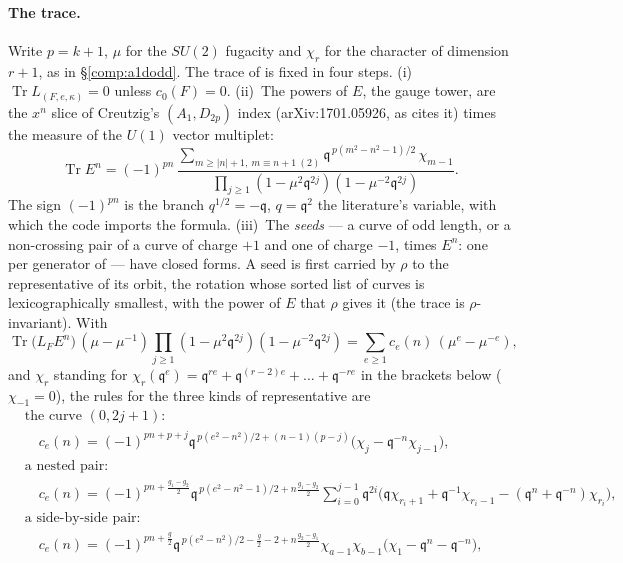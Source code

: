 \documentclass[11pt]{amsart}
\DeclareMathOperator{\Tr}{Tr}
\newcommand\fq{\mathfrak{q}}
\theoremstyle{remark}
\begin{document}
\paragraph{The trace.}  Write $p=k+1$, $\mu$ for the $SU(2)$ fugacity and
$\chi_r$ for the character of dimension $r+1$, as in \S\ref{comp:a1dodd}.
The trace of  is fixed in four steps.
(i)~$\Tr L_{(F,e,\kappa)}=0$ unless $c_0(F)=0$.
(ii)~The powers of $E$, the gauge tower, are the $x^n$ slice of Creutzig's
$(A_1,D_{2p})$ index (arXiv:1701.05926, as  cites
it) times the measure of the $U(1)$ vector multiplet:
\begin{equation}\label{eq:comp-deven-tower}
  \Tr E^n=(-1)^{pn}\,\frac{\sum_{m\ge|n|+1,\ m\equiv n+1\ (2)}\fq^{\,p(m^2-n^2-1)/2}\,\chi_{m-1}}
  {\prod_{j\ge1}(1-\mu^2\fq^{2j})(1-\mu^{-2}\fq^{2j})}.
\end{equation}
The sign $(-1)^{pn}$ is the branch $q^{1/2}=-\fq$, $q=\fq^2$ the
literature's variable, with which the code imports the formula.
(iii)~The \emph{seeds} --- a curve of odd length, or a non-crossing pair of a
curve of charge $+1$ and one of charge $-1$, times $E^n$: one per generator
of  --- have closed forms.  A seed is first carried by
$\rho$ to the representative of its orbit, the rotation whose sorted list of
curves is lexicographically smallest, with the power of $E$ that $\rho$ gives
it (the trace is $\rho$-invariant).  With
\[
  \Tr\bigl(L_FE^n\bigr)\,(\mu-\mu^{-1})\prod_{j\ge1}(1-\mu^2\fq^{2j})(1-\mu^{-2}\fq^{2j})
  =\sum_{e\ge1}c_e(n)\,(\mu^e-\mu^{-e}),
\]
and $\chi_r$ standing for $\chi_r(\fq^e)=\fq^{re}+\fq^{(r-2)e}+\dots+\fq^{-re}$
in the brackets below ($\chi_{-1}=0$), the rules for the three kinds of
representative are
\begin{equation}\label{eq:comp-deven-seeds}
\begin{aligned}
  &\text{the curve }(0,2j+1)\text{:}\\
  &\quad c_e(n)=(-1)^{pn+p+j}\fq^{\,p(e^2-n^2)/2+(n-1)(p-j)}\bigl(\chi_j-\fq^{-n}\chi_{j-1}\bigr),\\
  &\text{a nested pair:}\\
  &\quad c_e(n)=(-1)^{pn+\frac{g_1-g_2}2}\fq^{\,p(e^2-n^2-1)/2+n\frac{g_1-g_2}2}
     \sum_{i=0}^{j-1}\fq^{2i}\bigl(\fq\chi_{r_i+1}+\fq^{-1}\chi_{r_i-1}-(\fq^n+\fq^{-n})\chi_{r_i}\bigr),\\
  &\text{a side-by-side pair:}\\
  &\quad c_e(n)=(-1)^{pn+\frac g2}\fq^{\,p(e^2-n^2)/2-\frac g2-2+n\frac{g_2-g_1}2}
     \chi_{a-1}\chi_{b-1}\bigl(\chi_1-\fq^n-\fq^{-n}\bigr),
\end{aligned}
\end{equation}
\end{document}
